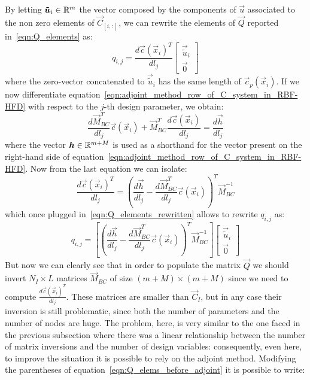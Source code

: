 By letting $\boldsymbol{\tilde{u}}_i \in \mathbb{R}^m$ the vector composed by the components of $\vec{u}$ associated to the non zero elements of $\vec{C}_{[i,:]}$, we can rewrite the elements of $\vec{Q}$ reported in~\eqref{eqn:Q_elements} as:
\begin{equation}
	\label{eqn:Q_elements_rewritten}
	q_{i,j} =
	\frac{d\vec{c}(\vec{x}_i)^T}{dl_j}
	\begin{bmatrix}
		\vec{\tilde{u}}_i  \\
		\vec{0}
	\end{bmatrix}
\end{equation}
where the zero-vector concatenated to $\vec{\tilde{u}}_i$ has the same length of $\vec{c}_p(\vec{x}_i)$.
If we now differentiate equation~\eqref{eqn:adjoint_method_row_of_C_system_in_RBF-HFD} with respect to the $j$-th design parameter, we obtain:
\begin{equation}
	\frac{d \vec{M}_{BC}^T}{d l_j} \vec{c}(\vec{x}_i) + \vec{M}_{BC}^T \frac{d \vec{c}(\vec{x}_i)}{d l_j} = \frac{d \vec{h}}{d l_j}
\end{equation}
where the vector $\boldsymbol{h} \in \mathbb{R}^{m+M}$ is used as a shorthand for the vector present on the right-hand side of equation~\eqref{eqn:adjoint_method_row_of_C_system_in_RBF-HFD}. Now from the last equation we can isolate:
\begin{equation}
	\frac{d \vec{c}(\vec{x}_i)^T}{dl_j} = \left( \frac{d \vec{h}}{d l_j} - \frac{d \vec{M}_{BC}^T}{d l_j} \vec{c}(\vec{x}_i) \right)^T \vec{M}_{BC}^{-1}
\end{equation}
which once plugged in~\eqref{eqn:Q_elements_rewritten} allows to rewrite $q_{i,j}$ as:
\begin{equation}
	\label{eqn:Q_elems_before_adjoint}
	q_{i,j} =
	\left[ \left( \frac{d \vec{h}}{d l_j} - \frac{d \vec{M}_{BC}^T}{d l_j} \vec{c}(\vec{x}_i) \right)^T \vec{M}_{BC}^{-1} \right]
	\begin{bmatrix}
		\vec{\tilde{u}}_i  \\
		\vec{0}
	\end{bmatrix}
\end{equation}
But now we can clearly see that in order to populate the matrix $\vec{Q}$ we should invert $N_I \times L$ matrices $\vec{M}_{BC}$ of size $(m+M) \times (m+M)$ since we need to compute $\frac{d \vec{c}(\vec{x}_i)^T}{dl_j}$. These matrices are smaller than $\vec{C}_I$, but in any case their inversion is still problematic, since both the number of parameters and the number of nodes are huge. The problem, here, is very similar to the one faced in the previous subsection where there was a linear relationship between the number of matrix inversions and the number of design variables: consequently, even here, to improve the situation it is possible to rely on the adjoint method. Modifying the parentheses of equation~\eqref{eqn:Q_elems_before_adjoint} it is possible to write:
